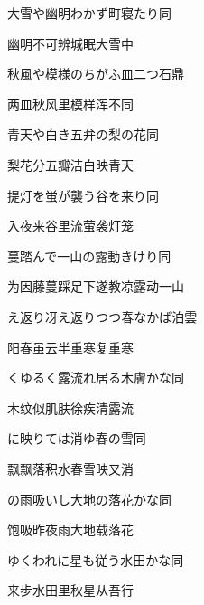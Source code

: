 \begin{haiku}
    {\FH 大雪や幽明わかず町寝たり}\hfill{\FH 同}

    {\FK 幽明不可辨城眠大雪中}
\end{haiku}

\begin{haiku}
    {\FH 秋風や模様のちがふ皿二つ}\hfill{\FH 石鼎}

    {\FK 两皿秋风里模样浑不同}
\end{haiku}

\begin{haiku}
    {\FH 青天や白き五弁の梨の花}\hfill{\FH 同}

    {\FK 梨花分五瓣洁白映青天}
\end{haiku}

\begin{haiku}
    {\FH 提灯を蛍が襲う谷を来り}\hfill{\FH 同}

    {\FK 入夜来谷里流萤袭灯笼}
\end{haiku}

\begin{haiku}
    {\FH 蔓踏んで一山の露動きけり}\hfill{\FH 同}

    {\FK 为因藤蔓踩足下遂教凉露动一山}
\end{haiku}

\begin{haiku}
    {\FH {}え返り冴え返りつつ春なかば}\hfill{\FH 泊雲}

    {\FK 阳春虽云半重寒复重寒}
\end{haiku}

\begin{haiku}
    {\FH {}くゆるく露流れ居る木膚かな}\hfill{\FH 同}

    {\FK 木纹似肌肤徐疾清露流}
\end{haiku}

\begin{haiku}
    {\FH {}に映りては消ゆ春の雪}\hfill{\FH 同}

    {\FK 飘飘落积水春雪映又消}
\end{haiku}

\begin{haiku}
    {\FH {}の雨吸いし大地の落花かな}\hfill{\FH 同}

    {\FK 饱吸昨夜雨大地载落花}
\end{haiku}

\begin{haiku}
    {\FH ゆくわれに星も従う水田かな}\hfill{\FH 同}

    {\FK 来步水田里秋星从吾行}
\end{haiku}

